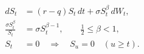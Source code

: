 \documentclass{equation-sheet}
\begin{document}
\begin{equation*}
\begin{aligned}
dS_t &= (r-q)S_t\,dt + \sigma S_t^{\beta}\,dW_t, \\
\frac{\sigma S_t^{\beta}}{S_t}
  &= \sigma S_t^{\beta-1},
\qquad \frac{1}{2}\leq\beta<1, \\
S_t&=0\quad\Longrightarrow\quad S_u=0\quad(u\geq t).
\end{aligned}
\end{equation*}
\end{document}
